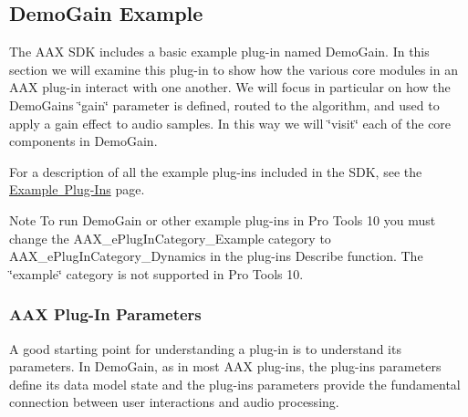  \hypertarget{a00794_aax_sdk_guide_02_demogain_example}{}\subsection{Demo\+Gain Example}\label{a00794_aax_sdk_guide_02_demogain_example}
The A\+AX S\+DK includes a basic example plug-\/in named Demo\+Gain. In this section we will examine this plug-\/in to show how the various core modules in an A\+AX plug-\/in interact with one another. We will focus in particular on how the Demo\+Gain\textquotesingle{}s \char`\"{}gain\char`\"{} parameter is defined, routed to the algorithm, and used to apply a gain effect to audio samples. In this way we will \char`\"{}visit\char`\"{} each of the core components in Demo\+Gain.

 For a description of all the example plug-\/ins included in the S\+DK, see the \mbox{\hyperlink{a00848}{Example Plug-\/\+Ins}} page.

 \begin{DoxyNote}{Note}
To run Demo\+Gain or other example plug-\/ins in Pro Tools 10 you must change the {\ttfamily A\+A\+X\+\_\+e\+Plug\+In\+Category\+\_\+\+Example} category to {\ttfamily A\+A\+X\+\_\+e\+Plug\+In\+Category\+\_\+\+Dynamics} in the plug-\/in\textquotesingle{}s Describe function. The \char`\"{}example\char`\"{} category is not supported in Pro Tools 10.
\end{DoxyNote}
\hypertarget{a00794_subsection__overview_of_parameter_creation}{}\subsubsection{A\+A\+X Plug-\/\+In Parameters}\label{a00794_subsection__overview_of_parameter_creation}
 A good starting point for understanding a plug-\/in is to understand its parameters. In Demo\+Gain, as in most A\+AX plug-\/ins, the plug-\/in\textquotesingle{}s parameters define its data model state and the plug-\/in\textquotesingle{}s parameters provide the fundamental connection between user interactions and audio processing.

